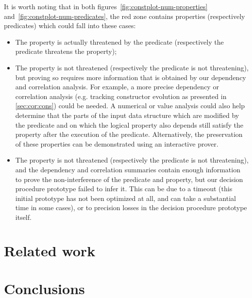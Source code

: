 \documentclass[11pt]{article}
\begin{document}
It is  worth noting  that in both figures~\ref{fig:constplot-num-properties}
and~\ref{fig:constplot-num-predicates},  the   red   zone contains
properties (respectively predicates) which could fall into these cases:
\begin{itemize}
\item  The  property is  actually  threatened  by  the predicate  (respectively  the
  predicate threatens the property);
\item  The  property   is  not  threatened  (respectively the predicate  is  not
  threatening), but proving so requires  more information that is obtained by
  our  dependency and  correlation  analysis.  For  example,  a more  precise
  dependency or correlation analysis  (e.g. tracking constructor evolution as
  presented in  \ref{sec:cor:cons}) could  be needed.   A numerical  or value
  analysis  could also  help  determine  that the  parts  of  the input  data
  structure which  are modified  by the  predicate and  on which  the logical
  property also depends still satisfy the property after the execution of the
  predicate.   Alternatively, the  preservation  of these  properties can  be
  demonstrated using an interactive prover.
\item  The  property   is  not  threatened  (respectively the predicate  is  not
  threatening), and  the dependency and correlation  summaries contain enough
  information to  prove the non-interference  of the predicate  and property,
  but our decision procedure prototype failed to infer it. This can be due to
  a timeout  (this initial prototype has  not been optimized at  all, and can
  take  a substantial  time in  some cases),  or to  precision losses  in the
  decision procedure prototype itself.
\end{itemize}


\section{Related work}

\section{Conclusions}



\end{document}
